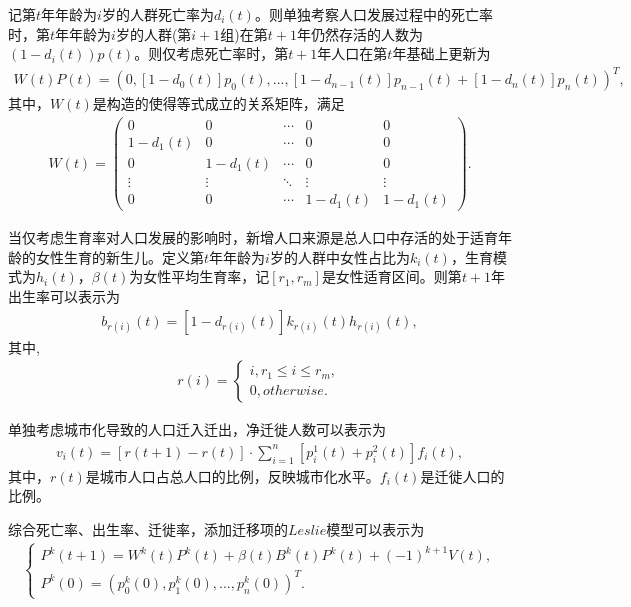 \documentclass{whutmod}
\begin{document}
		记第$t$年年龄为$i$岁的人群死亡率为$d_i(t)$。则单独考察人口发展过程中的死亡率时，第$t$年年龄为$i$岁的人群(第$i+1$组)在第$t+1$年仍然存活的人数为$(1-d_i(t))p(t)$。则仅考虑死亡率时，第$t+1$年人口在第$t$年基础上更新为
		\begin{gather}
		W(t)P(t)=(0,[1-d_0(t)]p_0(t),...,[1-d_{n-1}(t)]p_{n-1}(t)+[1-d_{n}(t)]p_{n}(t))^T,
		\end{gather}
		其中，$W(t)$是构造的使得等式成立的关系矩阵，满足
		\begin{gather}
		W(t)=\begin{pmatrix}
		0 & 0 & \cdots  & 0 & 0\\ 
		1-d_1(t) & 0 & \cdots  & 0 & 0\\ 
		0 & 1-d_1(t) & \cdots  & 0  & 0\\ 
		\vdots  & \vdots  & \ddots  & \vdots & \vdots\\ 
		0 & 0 & \cdots  & 1-d_1(t) & 1-d_1(t)
		\end{pmatrix}.
		\end{gather}
		
		当仅考虑生育率对人口发展的影响时，新增人口来源是总人口中存活的处于适育年龄的女性生育的新生儿。定义第$t$年年龄为$i$岁的人群中女性占比为$k_i(t)$，生育模式为$h_i(t)$，$\beta(t)$为女性平均生育率，记$[r_1,r_m]$是女性适育区间。则第$t+1$年出生率可以表示为
		\begin{gather}
		b_{r(i)}(t)=[1-d_{r(i)}(t)]k_{r(i)}(t)h_{r(i)}(t),
		\end{gather}
		其中,\begin{gather}
		r(i)=\left\{\begin{matrix}
		i,r_1 \leq i\leq r_m,
		\\ 
		0,otherwise.
		\end{matrix}\right.
		\end{gather}
		
		单独考虑城市化导致的人口迁入迁出，净迁徙人数可以表示为
		\begin{gather}
		v_i(t)=[r(t+1)-r(t)]\cdot \sum_{i=1}^{n}[p_i^1(t)+p_i^2(t)]f_i(t),
		\end{gather}
		其中，$r(t)$是城市人口占总人口的比例，反映城市化水平。$f_i(t)$是迁徙人口的比例。
		
		综合死亡率、出生率、迁徙率，添加迁移项的$Leslie$模型可以表示为
		\begin{gather}
		\left\{\begin{matrix} 
		P^k(t+1)=W^k(t)P^k(t)+\beta(t)B^k(t)P^k(t)+(-1)^{k+1}V(t),\\ 
		P^k(0)=(p^k_0(0),p^k_1(0),...,p^k_{n}(0))^T.
		\end{matrix}\right.
		\end{gather}
		
\end{document}
